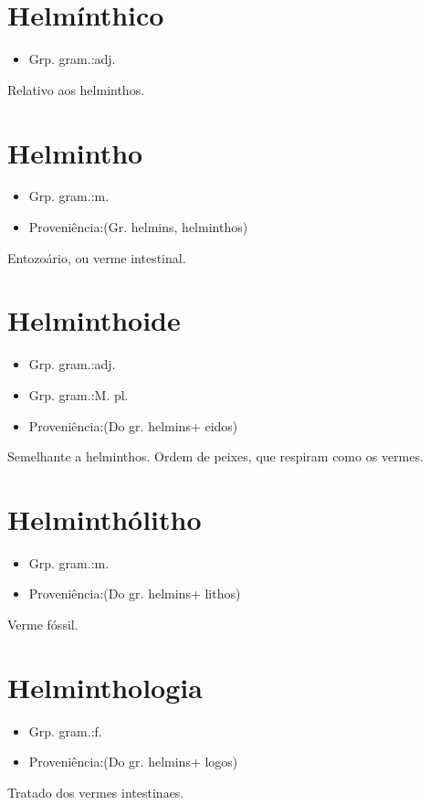 \documentclass{article}
\begin{document}
\section{Helmínthico}
\begin{itemize}
\item {Grp. gram.:adj.}
\end{itemize}
Relativo aos helminthos.
\section{Helmintho}
\begin{itemize}
\item {Grp. gram.:m.}
\end{itemize}
\begin{itemize}
\item {Proveniência:(Gr. \textunderscore helmins\textunderscore , \textunderscore helminthos\textunderscore )}
\end{itemize}
Entozoário, ou verme intestinal.
\section{Helminthoide}
\begin{itemize}
\item {Grp. gram.:adj.}
\end{itemize}
\begin{itemize}
\item {Grp. gram.:M. pl.}
\end{itemize}
\begin{itemize}
\item {Proveniência:(Do gr. \textunderscore helmins\textunderscore  + \textunderscore eidos\textunderscore )}
\end{itemize}
Semelhante a helminthos.
Ordem de peixes, que respiram como os vermes.
\section{Helminthólitho}
\begin{itemize}
\item {Grp. gram.:m.}
\end{itemize}
\begin{itemize}
\item {Proveniência:(Do gr. \textunderscore helmins\textunderscore  + \textunderscore lithos\textunderscore )}
\end{itemize}
Verme fóssil.
\section{Helminthologia}
\begin{itemize}
\item {Grp. gram.:f.}
\end{itemize}
\begin{itemize}
\item {Proveniência:(Do gr. \textunderscore helmins\textunderscore  + \textunderscore logos\textunderscore )}
\end{itemize}
Tratado dos vermes intestinaes.
\end{document}
